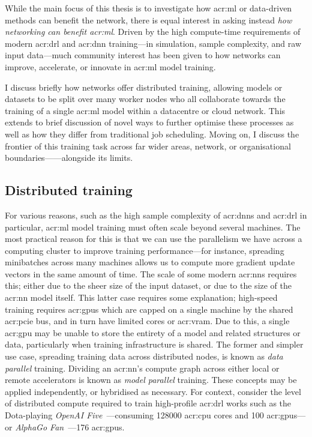 While the main focus of this thesis is to investigate how \gls{acr:ml} or data-driven methods can benefit the network, there is equal interest in asking instead \emph{how networking can benefit \gls{acr:ml}}.
Driven by the high compute-time requirements of modern \gls{acr:drl} and \gls{acr:dnn} training---in simulation, sample complexity, and raw input data---much community interest has been given to how networks can improve, accelerate, or innovate in \gls{acr:ml} model training.

I discuss briefly how networks offer distributed training, allowing models or datasets to be split over many worker nodes who all collaborate towards the training of a single \gls{acr:ml} model within a datacentre or cloud network.
This extends to brief discussion of novel ways to further optimise these processes as well as how they differ from traditional job scheduling.
Moving on, I discuss the frontier of this training task across far wider areas, network, or organisational boundaries------alongside its limits.


\subsection{Distributed training}
For various reasons, such as the high sample complexity of \glspl{acr:dnn} and \gls{acr:drl} in particular, \gls{acr:ml} model training must often scale beyond several machines.
The most practical reason for this is that we can use the parallelism we have across a computing cluster to improve training performance---for instance, spreading minibatches across many machines allows us to compute more gradient update vectors in the same amount of time.
The scale of some modern \glspl{acr:nn} requires this; either due to the sheer size of the input dataset, or due to the size of the \gls{acr:nn} model itself.
This latter case requires some explanation; high-speed training requires \glspl{acr:gpu} which are capped on a single machine by the shared \gls{acr:pcie} bus, and in turn have limited cores or \gls{acr:vram}.
Due to this, a single \gls{acr:gpu} may be unable to store the entirety of a model and related structures or data, particularly when training infrastructure is shared.
The former and simpler use case, spreading training data across distributed nodes, is known as \emph{data parallel} training.
Dividing an \gls{acr:nn}'s compute graph across either local or remote accelerators is known as \emph{model parallel} training.
These concepts may be applied independently, or hybridised as necessary.
For context, consider the level of distributed compute required to train high-profile \gls{acr:drl} works such as the Dota-playing \emph{OpenAI Five}~\parencite{openai-five}---consuming \num{128000} \gls{acr:cpu} cores and \num{100} \glspl{acr:gpu}---or \emph{AlphaGo Fan}~\parencite{DBLP:journals/nature/SilverSSAHGHBLB17}---\num{176} \glspl{acr:gpu}. 	

